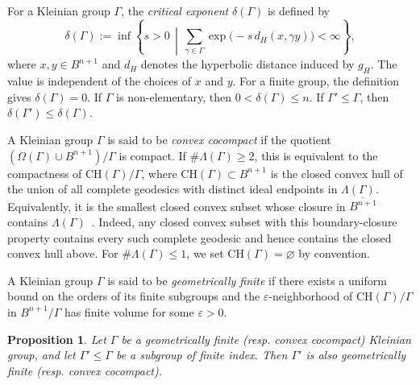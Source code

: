 \documentclass[12pt,oneside,a4paper]{article}
\newtheorem{proposition}[definition]{Proposition}
\theoremstyle{mytheorem}
\theoremstyle{remark}
\theoremstyle{definition}
\begin{document}
For a Kleinian group \(\Gamma\), the \emph{critical exponent}
\(\delta(\Gamma)\) is defined by
\[
\delta(\Gamma):=\inf\left\{s>0\,\middle|\,
\sum_{\gamma\in\Gamma}\exp\bigl(-s\,d_H(x,\gamma y)\bigr)<\infty\right\},
\]
where \(x,y\in B^{n+1}\) and \(d_H\) denotes the hyperbolic distance
induced by \(g_H\). The value is independent of the choices of \(x\) and
\(y\). For a finite group, the definition gives \(\delta(\Gamma)=0\). If
\(\Gamma\) is non-elementary, then \(0<\delta(\Gamma)\leq n\). If
\(\Gamma'\leq\Gamma\), then \(\delta(\Gamma')\leq\delta(\Gamma)\).

 

A Kleinian group \( \Gamma \) is said to be \emph{convex cocompact} if the quotient
$(\Omega(\Gamma) \cup B^{n+1}) / \Gamma$ is compact. If
\(\#\Lambda(\Gamma)\geq2\), this is equivalent to the compactness of
\(\mathrm{CH}(\Gamma)/\Gamma\), where \(\mathrm{CH}(\Gamma)\subset B^{n+1}\)
is the closed convex hull of the union of all complete geodesics with distinct
ideal endpoints in \(\Lambda(\Gamma)\). Equivalently, it is the smallest
closed convex subset whose closure in \(\overline{B^{n+1}}\) contains
\(\Lambda(\Gamma)\)~\cite{MR1218098}.
Indeed, any closed convex subset with this boundary-closure property contains
every such complete geodesic and hence contains the closed convex hull above.
For \(\#\Lambda(\Gamma)\leq1\), we set \(\mathrm{CH}(\Gamma)=\varnothing\)
by convention.



A Kleinian group \( \Gamma \) is said to be \emph{geometrically finite} if there exists a uniform bound on the orders of its finite subgroups and the \( \varepsilon \)-neighborhood of \( \mathrm{CH}(\Gamma)/\Gamma \) in \( B^{n+1}/\Gamma \) has finite volume for some \( \varepsilon > 0 \).

\begin{proposition} \label{geo finite}
Let \( \Gamma \) be a geometrically finite (resp. convex cocompact) Kleinian group, and let \( \Gamma' \leq \Gamma \) be a subgroup of finite index. Then \( \Gamma' \) is also geometrically finite (resp. convex cocompact).
\end{proposition}
\end{document}
